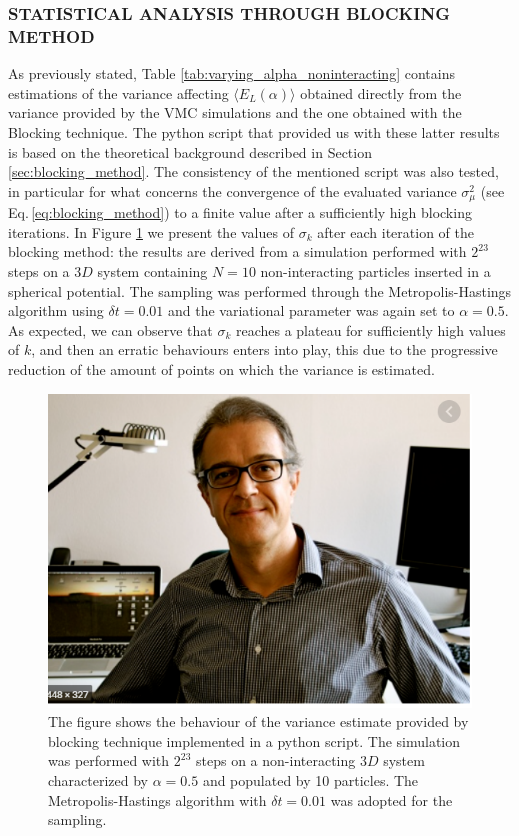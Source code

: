 \subsubsection{STATISTICAL ANALYSIS THROUGH BLOCKING METHOD}
As previously stated, Table \ref{tab:varying_alpha_noninteracting} contains estimations of the variance affecting $\langle E_L(\alpha) \rangle$ obtained directly from the variance provided by the VMC simulations and the one obtained with the Blocking technique. The python script that provided us with these latter results is based on the theoretical background described in Section \ref{sec:blocking_method}. The consistency of the mentioned script was also tested, in particular for what concerns the convergence of the evaluated variance $\sigma_\mu^2$ (see Eq.\,\ref{eq:blocking_method}) to a finite value after a sufficiently high blocking iterations. In Figure \ref{fig:blocking_analysis} we present the values of $\sigma_k$ after each iteration of the blocking method: the results are derived from a simulation performed with $2^{23}$ steps on a $3D$ system containing $N=10$ non-interacting particles inserted in a spherical potential. The sampling was performed through the Metropolis-Hastings algorithm using $\delta t=0.01$ and the variational parameter was again set to $\alpha=0.5$. As expected, we can observe that $\sigma_k$ reaches a plateau for sufficiently high values of $k$, and then an erratic behaviours enters into play, this due to the progressive reduction of the amount of points on which the variance is estimated. 

\begin{figure}[H]
    \centering
    \includegraphics[scale=0.45]{images/yaaaa.png}
    \caption{The figure shows the behaviour of the variance estimate provided by blocking technique implemented in a python script. The simulation was performed with $2^{23}$ steps on a non-interacting $3D$ system characterized by $\alpha=0.5$ and populated by 10 particles. The Metropolis-Hastings algorithm with $\delta t =0.01$ was adopted for the sampling.}
    \label{fig:blocking_analysis}
\end{figure}


